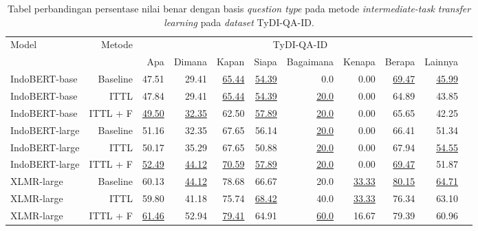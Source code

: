 \begin{table}[H]\centering
\scriptsize
 \begin{tabular}{lrrrrrrrrrr}\toprule
\multirow{2}{*}{Model} &\multirow{2}{*}{Metode} &\multicolumn{8}{c}{TyDI-QA-ID} \\\cmidrule{3-10}
& &Apa &Dimana &Kapan &Siapa &Bagaimana &Kenapa &Berapa &Lainnya \\\midrule
IndoBERT-base &Baseline &47.51 &29.41 &\underline{65.44} &\underline{54.39} &0.0 &0.00 &\underline{69.47} &\underline{45.99} \\
IndoBERT-base &ITTL &47.84 &29.41 &\underline{65.44} &\underline{54.39} &\underline{20.0} &0.00 &64.89 &43.85 \\
IndoBERT-base &ITTL + F &\underline{49.50} &\underline{32.35} &62.50 &\underline{57.89} &\underline{20.0} &0.00 &65.65 &42.25 \\
\hline
IndoBERT-large &Baseline &51.16 &32.35 &67.65 &56.14 &\underline{20.0} &0.00 &66.41 &51.34 \\
IndoBERT-large &ITTL &50.17 &35.29 &67.65 &50.88 &\underline{20.0} &0.00 &67.94 &\underline{54.55} \\
IndoBERT-large &ITTL + F &\underline{52.49} &\underline{44.12} &\underline{70.59} &\underline{57.89} &\underline{20.0} &0.00 &\underline{69.47} &51.87 \\
\hline
XLMR-large &Baseline &60.13 &\underline{44.12} &78.68 &66.67 &20.0 &\underline{33.33} &\underline{80.15} &\underline{64.71} \\
XLMR-large &ITTL &59.80 &41.18 &75.74 &\underline{68.42} &40.0 &\underline{33.33} &76.34 &63.10 \\
XLMR-large &ITTL + F &\underline{61.46} &52.94 &\underline{79.41} &64.91 &\underline{60.0} &16.67 &79.39 &60.96 \\
\bottomrule
\end{tabular}
\caption{Tabel perbandingan persentase nilai benar dengan basis \emph{question type} pada metode \emph{intermediate-task transfer learning} pada \emph{dataset} TyDI-QA-ID.}
\end{table}


